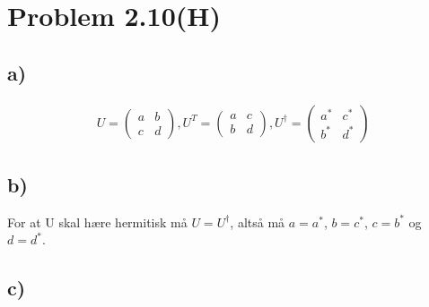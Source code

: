 \documentclass[norsk,a4paper,12pt]{article}
\begin{document}
	\section*{Problem 2.10(H)}
	
	\subsection*{a)}
	
		\begin{equation}
		\begin{aligned}
		U = \begin{pmatrix} a & b \\ c & d \end{pmatrix}, U^T = \begin{pmatrix} a & c \\ b & d \end{pmatrix}
		, U^\dagger = \begin{pmatrix} a^* & c^* \\ b^* & d^* \end{pmatrix}
		\end{aligned}
		\end{equation}
		
	\subsection*{b)}
	
		For at U skal hære hermitisk må $U = U^\dagger$, altså må $a = a^*$, $b = c^*$, $c = b^*$ og $d = d^*$.
		
	\subsection*{c)}
	
\end{document}
